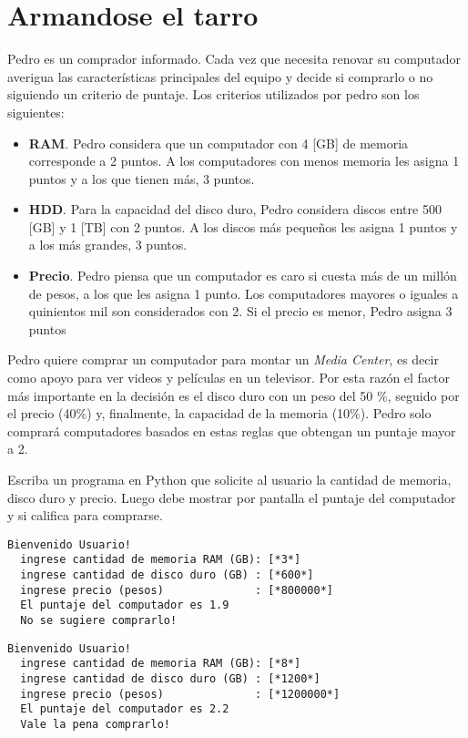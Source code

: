 \section{Armandose el tarro}

  Pedro es un comprador informado.
  Cada vez que necesita renovar su computador
  averigua las características principales del equipo
  y decide si comprarlo o no siguiendo un criterio 
  de puntaje.
  Los criterios utilizados por pedro son los siguientes:
  
  \begin{itemize}
  \item
    \textbf{RAM}.
    Pedro considera que un computador con 4 [GB] de memoria
    corresponde a 2 puntos.
    A los computadores con menos memoria les asigna 1 puntos
    y a los que tienen más,
    3 puntos.
  \item
    \textbf{HDD}.
    Para la capacidad del disco duro,
    Pedro considera discos entre 
    500 [GB] y 1 [TB] con 2 puntos.
    A los discos más pequeños les asigna 1 puntos
    y a los más grandes,
    3 puntos.
  \item
    \textbf{Precio}.
    Pedro piensa que un computador es caro
    si cuesta más de un millón de pesos,
    a los que les asigna 1 punto.
    Los computadores mayores o iguales a quinientos mil
    son considerados con 2.
    Si el precio es menor,
    Pedro asigna 3 puntos
  \end{itemize}

  Pedro quiere comprar un computador para montar
  un \emph{Media Center},
  es decir como apoyo para ver videos y películas en un
  televisor.
  Por esta razón el factor más importante en la decisión es
  el disco duro con un peso del 50 \%,
  seguido por el precio (40\%) y,
  finalmente,
  la capacidad de la memoria (10\%).
  Pedro solo comprará computadores basados en estas reglas
  que obtengan un puntaje mayor a 2.
  
  Escriba un programa en Python que solicite al usuario
  la cantidad de memoria,
  disco duro y precio.
  Luego debe mostrar por pantalla el puntaje del computador
  y si califica para comprarse.
  
  
  \begin{lstlisting}[style=consola]
  Bienvenido Usuario!
  ingrese cantidad de memoria RAM (GB): [*3*]
  ingrese cantidad de disco duro (GB) : [*600*]
  ingrese precio (pesos)              : [*800000*]
  El puntaje del computador es 1.9
  No se sugiere comprarlo!
  \end{lstlisting}
  
  \begin{lstlisting}[style=consola]
  Bienvenido Usuario!
  ingrese cantidad de memoria RAM (GB): [*8*]
  ingrese cantidad de disco duro (GB) : [*1200*]
  ingrese precio (pesos)              : [*1200000*]
  El puntaje del computador es 2.2
  Vale la pena comprarlo!
  \end{lstlisting}
  
  \pagebreak[4]